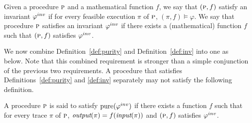 
\begin{definition}[Invariant]
\label{def:inv}
Given a procedure $\textsc{p}$ and a mathematical function $f$, we say that $(\textsc{p},f)$ satisfy
an invariant $\varphi^{inv}$ if for every feasible execution $\pi$ of $\textsc{p}$, $(\pi,f) \models \varphi$.
We say that procedure $\textsc{p}$ satisfies an invariant $\varphi^{inv}$ if there exists a (mathematical)
function $f$ such that $(\textsc{p},f)$ satisfies $\varphi^{inv}$.
\end{definition}

We now combine Definition~\ref{def:purity} and Definition~\ref{def:inv} into one as below.
Note that this combined requirement is stronger than a simple conjunction of the previous
two requirements. A procedure that satisfies Definitions~\ref{def:purity} and \ref{def:inv}
separately may not satisfy the following definition.
\begin{definition}
\label{def:pureinv}
A procedure $\textsc{p}$ is said to satisfy $\mathrm{pure}(\varphi^{inv})$ if
there exists a function $f$ such that for every trace $\pi$ of $\textsc{p}$,
$\textit{output}(\pi) = f(\textit{input}(\pi))$ and $(\textsc{p},f)$ satisfies $\varphi^{inv}$.
\end{definition}